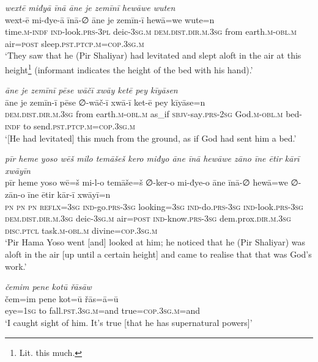 \ea \label{ŽP.68}
\textit{wextē miđyā īnā āne je zemīnī hewāwe wuten} \\ 
\gll wext-ē mi-đye-ā īnā-∅ āne je zemīn-ī hewā=we wute=n \\ 
 time\textsc{.m}\textsc{-indf} \textsc{ind-}look\textsc{.prs}\textsc{-3pl} deic\textsc{-3sg}\textsc{.m} \textsc{dem.dist}\textsc{.dir}\textsc{.m}\textsc{.3sg} from earth\textsc{.m}\textsc{-obl}\textsc{.m} air\textsc{=\textsc{post}} sleep\textsc{.pst}\textsc{.ptcp}\textsc{.m}\textsc{=cop}\textsc{.3sg}\textsc{.m} \\ 
\glt `They saw that he (Pir Shaliyar) had levitated and slept aloft in the air at this height\footnote{Lit. this much.} (informant indicates the height of the bed with his hand).'
\z 
 
\ea \label{ŽP.69}
\textit{āne je zemīnī pēse wāčī xwāy ketē pey kīyāsen} \\ 
\gll āne je zemīn-ī pēse ∅-wāč-ī xwā-ī ket-ē pey kīyāse=n \\ 
 \textsc{dem.dist}\textsc{.dir}\textsc{.m}\textsc{.3sg} from earth\textsc{.m}\textsc{-obl}\textsc{.m} as\_if \textsc{sbjv-}say\textsc{.prs-}\textsc{2sg} God\textsc{.m}\textsc{-obl}\textsc{.m} bed\textsc{-indf} to send\textsc{.pst}\textsc{.ptcp}\textsc{.m}\textsc{=cop}\textsc{.3sg}\textsc{.m} \\ 
\glt `[He had levitated] this much from the ground, as if God had sent him a bed.'
\z 
 
\ea \label{ŽP.71}
\textit{pīr heme yoso wēš milo temāšeš kero miđyo āne īnā hewāwe zāno īne ētir kārī xwāyīn} \\ 
\gll pīr heme yoso wē=š mi-l-o temāše=š ∅-ker-o mi-đye-o āne īnā-∅ hewā=we ∅-zān-o īne ētir kār-ī xwāyī=n \\ 
 \textsc{pn} \textsc{pn} \textsc{pn} \textsc{reflx}\textsc{=3sg} \textsc{ind-}go\textsc{.prs}\textsc{-3sg} looking\textsc{=3sg} \textsc{ind-}do\textsc{.prs}\textsc{-3sg} \textsc{ind-}look\textsc{.prs}\textsc{-3sg} \textsc{dem.dist}\textsc{.dir}\textsc{.m}\textsc{.3sg} deic\textsc{-3sg}\textsc{.m} air\textsc{=\textsc{post}} \textsc{ind-}know\textsc{.prs}\textsc{-3sg} dem.prox\textsc{.dir}\textsc{.m}\textsc{.3sg} \textsc{disc.ptcl} task\textsc{.m}\textsc{-obl}\textsc{.m} divine\textsc{=cop}\textsc{.3sg}\textsc{.m} \\ 
\glt `Pir Hama Yoso went [and] looked at him; he noticed that he (Pir Shaliyar) was aloft in the air [up until a certain height] and came to realise that that was God’s work.'
\z 
 
\ea \label{ŽP.76}
\textit{čemim pene kotū řāsāw} \\ 
\gll čem=im pene kot=ū řās=ā=ū \\ 
 eye\textsc{=\textsc{1sg}} to fall\textsc{.pst}\textsc{.3sg}\textsc{.m}=and true\textsc{=cop}\textsc{.3sg}\textsc{.m}=and \\ 
\glt `I caught sight of him. It’s true [that he has supernatural powers]'
\z 
 
